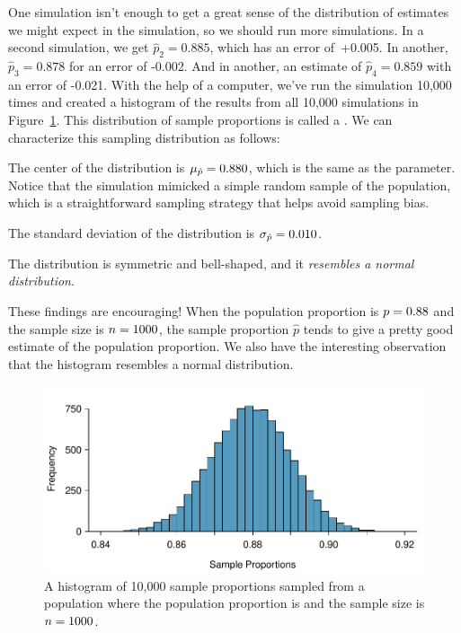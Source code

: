 One simulation isn't enough to get a great sense of the
distribution of estimates we might expect in the simulation,
so we should run more simulations.
In a second simulation,
we get $\hat{p}_2 = 0.885$, which has an error of~+0.005.
In another, $\hat{p}_3 = 0.878$ for an error of -0.002.
And in another,
an estimate of $\hat{p}_4 = 0.859$ with an error of -0.021.
With the help of a computer, we've run the simulation 10,000 times
and created a histogram of the results from all 10,000 simulations
in Figure~\ref{sampling_10k_prop_88p}. This
distribution of sample proportions is called a
.
We can characterize this sampling distribution as follows:
\begin{description}
\setlength{\itemsep}{0mm}
\item[Center.]
    The center of the distribution is
    $\mu_{\hat{p}} = 0.88{}0$,
    which is the same as the parameter.
    Notice that the simulation mimicked a simple random sample
    of the population, which is a straightforward sampling
    strategy that helps avoid sampling bias.
\item[Spread.]
    The standard deviation of the distribution
    is $\sigma_{\hat{p}} = 0.010{}$.
  
\item[Shape.]
    The distribution is symmetric and bell-shaped,
    and it \emph{resembles a normal distribution}.
\end{description}
These findings are encouraging!
When the population
proportion is $p = 0.88{}$ and the sample size is
$n = 1000{}$,
the sample proportion $\hat{p}$ tends to give
a pretty good estimate
of the population proportion.
We also have the interesting observation
that the histogram resembles a normal distribution.

\begin{figure}
   \centering
   \includegraphics[]{ch_foundations_for_inf/figures/sampling_10k_prop_88p/sampling_10k_prop_88p}
   \caption{A histogram of 10,000 sample proportions sampled from a population where the population
       proportion is \pewsolarparprop{} and the sample size is
       $n = 1000{}$.}
   \label{sampling_10k_prop_88p}
\end{figure}


